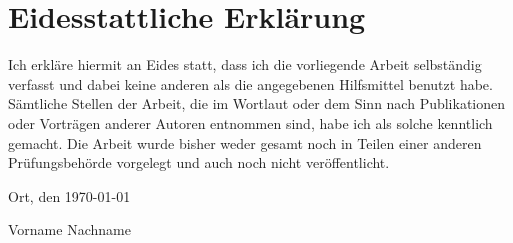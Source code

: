 \section*{Eidesstattliche Erklärung}

Ich erkläre hiermit an Eides statt, dass ich die vorliegende Arbeit selbständig verfasst und dabei keine anderen als die angegebenen Hilfsmittel benutzt habe. Sämtliche Stellen der Arbeit, die im Wortlaut oder dem Sinn nach Publikationen oder Vorträgen anderer Autoren entnommen sind, habe ich als solche kenntlich gemacht. Die Arbeit wurde bisher weder gesamt noch in Teilen einer anderen Prüfungsbehörde vorgelegt und auch noch nicht veröffentlicht.

\vspace{1.5cm}

\begin{flushright}
    Ort, den \today

    \vspace{0.7cm}
    Vorname Nachname
\end{flushright}